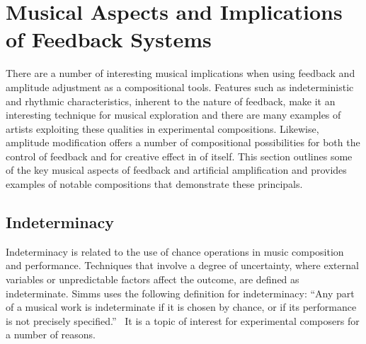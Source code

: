 \documentclass[titlepage]{scrartcl}
\begin{document}
    \section{Musical Aspects and Implications of Feedback Systems}
    There are a number of interesting musical implications when using feedback
    and amplitude adjustment as a compositional tools. Features such as
    indeterministic and rhythmic characteristics, inherent to the nature
    of feedback, make it an interesting technique for musical exploration and
    there are many examples of artists exploiting these qualities in
    experimental compositions. Likewise, amplitude modification offers a number
    of compositional possibilities for both the control of feedback and for
    creative effect in of itself. This section outlines some of the key musical
    aspects of feedback and artificial amplification and provides examples of
    notable compositions that demonstrate these principals.

    \subsection{Indeterminacy}\label{indeterminate}
    Indeterminacy is related to the use of chance operations in music
    composition and performance. Techniques that involve a degree of
    uncertainty, where external variables or unpredictable factors affect the
    outcome, are defined as indeterminate. Simms uses the following definition
    for indeterminacy:
    ``Any part of a musical work is indeterminate if it is chosen by chance, or
    if its performance is not precisely
    specified.''~\parencite[p.357]{simms1986mtc} It is a topic of interest for
    experimental composers for a number of reasons.
\end{document}

